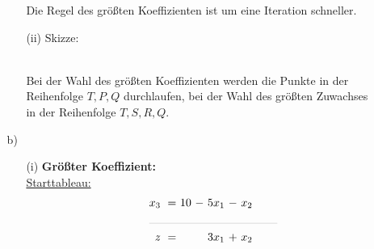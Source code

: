 \documentclass [a4paper,11pt]{article}
\begin{document}
\begin{enumerate}
\begin{enumerate}
\begin{enumerate}
                        Die Regel des größten Koeffizienten ist um eine Iteration schneller.

                    \item[(ii)]
                        Skizze:\\
                        \\
                        Bei der Wahl des größten Koeffizienten werden die Punkte in der Reihenfolge $T, P, Q$ durchlaufen,
                        bei der Wahl des größten Zuwachses in der Reihenfolge $T, S, R, Q$.
                \end{enumerate}
            \item[b)]
                \begin{enumerate}
                    \item[(i)]
                        \textbf{Größter Koeffizient:}\\
                        \underline{Starttableau:}
                        \begin{align*}
                        \begin{alignedat}{6}
                        && x_3 &\ = &\ 10 &\ - &\ 5x_1 &\ - &\  x_2 \\
                        &\rlap{\rule{4cm}{.1pt}} &&&&&&&\\
                        && z   &\ = &\    &    &\ 3x_1 &\ + &\  x_2
                        \end{alignedat}
                        \end{align*}


\end{enumerate}
\end{enumerate}
\end{enumerate}
\end{document}
